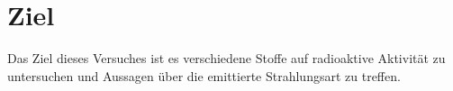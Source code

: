 \section{Ziel}
\label{sec:Ziel}
Das Ziel dieses Versuches ist es verschiedene Stoffe auf radioaktive Aktivität zu untersuchen und Aussagen über die emittierte Strahlungsart zu treffen. 